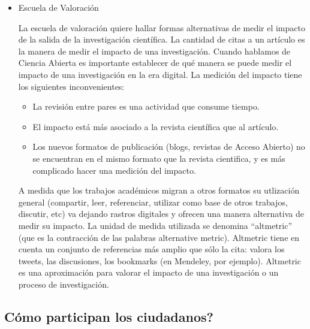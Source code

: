 \begin{itemize}
	\item {Escuela de Valoración} 	
	
	La escuela de valoración quiere hallar formas alternativas de medir el impacto de la salida de la investigación científica. La cantidad de citas a un artículo es la manera de medir el impacto de una investigación. Cuando hablamos de Ciencia Abierta es importante establecer de qué manera se puede medir el impacto de una investigación en la era digital. La medición del impacto tiene los siguientes inconvenientes:
	\begin{itemize}
	\item La revisión entre pares es una actividad que consume tiempo.
	\item El impacto está más asociado a la revista científica que al artículo.
	\item Los nuevos formatos de publicación (blogs, revistas de Acceso Abierto) no se encuentran en el mismo formato que la revista cientifica, y es más complicado hacer una medición del impacto.
	\end{itemize}
	A medida que los trabajos académicos migran a otros formatos su utlización general (compartir, leer, referenciar, utilizar como base de otros trabajos, discutir, etc) va dejando rastros digitales y ofrecen una manera alternativa de medir su impacto. La unidad de medida utilizada se denomina ``altmetric'' (que es la contracción de las palabras alternative metric). Altmetric tiene en cuenta un conjunto de referencias más amplio que sólo la cita: valora los tweets, las discusiones, los bookmarks (en Mendeley, por ejemplo). Altmetric es una aproximación para valorar el impacto de una investigación o un proceso de investigación. 
	
	
\end{itemize}	
	
\subsection{Cómo participan los ciudadanos?}

